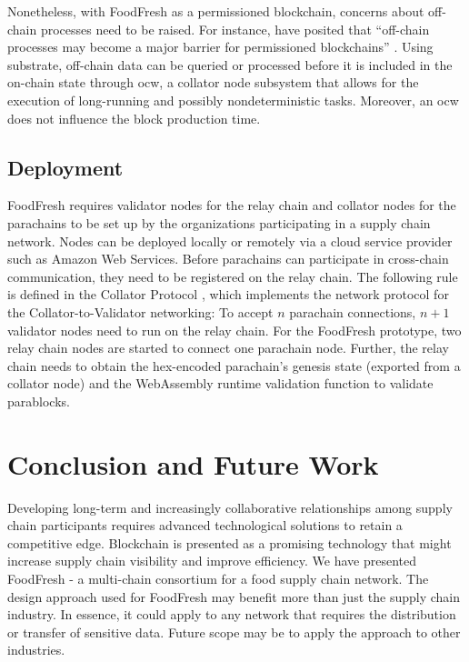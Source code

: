 \documentclass[conference]{IEEEtran}
\begin{document}
Nonetheless, with FoodFresh as a permissioned blockchain, concerns about off-chain processes need to be raised. For instance, \citeauthor{HELLIAR2020102136} have posited that ``off-chain processes may become a major barrier for permissioned blockchains'' \cite{HELLIAR2020102136}. Using substrate, off-chain data can be queried or processed before it is included in the on-chain state through \ac{ocw}, a collator node subsystem that allows for the execution of long-running and possibly nondeterministic tasks. Moreover, an \ac{ocw} does not influence the block production time.

\subsection{Deployment} \label{s:deployment}
FoodFresh requires validator nodes for  the relay chain and collator nodes for the parachains to be set up by the organizations participating in a supply chain network. Nodes can be deployed locally or remotely via a cloud service provider such as Amazon Web Services. 
Before parachains can participate in cross-chain communication, they need to be registered on the relay chain. The following rule is defined in the Collator Protocol \cite{collatorProtocol}, which implements the network protocol for the Collator-to-Validator networking: To accept $n$ parachain connections, $n + 1$ validator nodes need to run on the relay chain. For the FoodFresh prototype, two relay chain nodes are started to connect one parachain node. Further, the relay chain needs to obtain the hex-encoded parachain's genesis state (exported from a collator node) and the WebAssembly runtime validation function to validate parablocks.

\section{Conclusion and Future Work} \label{s:conclusion}
Developing long-term and increasingly collaborative relationships among supply chain participants requires advanced technological solutions to retain a competitive edge. Blockchain is presented as a promising technology that might increase supply chain visibility and improve efficiency.  We have presented FoodFresh - a multi-chain consortium for a food supply chain network. The design approach used for FoodFresh may benefit more than just the supply chain industry. In essence, it could apply to any network that requires the distribution or transfer of sensitive data. Future scope may be to apply the approach to other industries. 

\renewcommand*{\UrlFont}{\rmfamily}
\printbibliography
\vspace{12pt}
\end{document}
